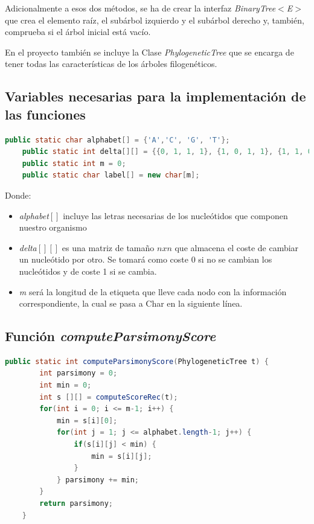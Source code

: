 \documentclass[11pt,letterpaper]{article}
\begin{document}
Adicionalmente a esos dos métodos, se ha de crear la interfaz \textit{BinaryTree$<$E$>$} que crea el elemento raíz, el subárbol izquierdo y el subárbol derecho y, también, comprueba si el árbol inicial está vacío. 

En el proyecto también se incluye la Clase \textit{PhylogeneticTree} que se encarga de tener todas las características de los árboles filogenéticos.

\subsection{Variables necesarias para la implementación de las funciones}

\begin{lstlisting}[language=Java]
	public static char alphabet[] = {'A','C', 'G', 'T'};
	public static int delta[][] = {{0, 1, 1, 1}, {1, 0, 1, 1}, {1, 1, 0, 1}, {1, 1, 1, 0}};
	public static int m = 0;
	public static char label[] = new char[m];
\end{lstlisting}	

Donde:
\begin{itemize}
	\item \textit{alphabet$[]$} incluye las letras necesarias de los nucleótidos que componen nuestro organismo
	\item \textit{delta$[][]$} es una matriz de tamaño $ n x n $ que almacena el coste de cambiar un nucleótido por otro. Se tomará como coste 0 si no se cambian los nucleótidos y de coste 1 si se cambia.
	\item \textit{m} será la longitud de la etiqueta que lleve cada nodo con la información correspondiente, la cual se pasa a Char en la siguiente línea.
\end{itemize}


\subsection{Función \textit{computeParsimonyScore}}

\begin{lstlisting}[language=Java]
	public static int computeParsimonyScore(PhylogeneticTree t) {
		int parsimony = 0;
		int min = 0;
		int s [][] = computeScoreRec(t);
		for(int i = 0; i <= m-1; i++) {
			min = s[i][0];
			for(int j = 1; j <= alphabet.length-1; j++) {
				if(s[i][j] < min) {
					min = s[i][j];
				}
			} parsimony += min;
		}
		return parsimony;
	}
\end{lstlisting}
\end{document}
